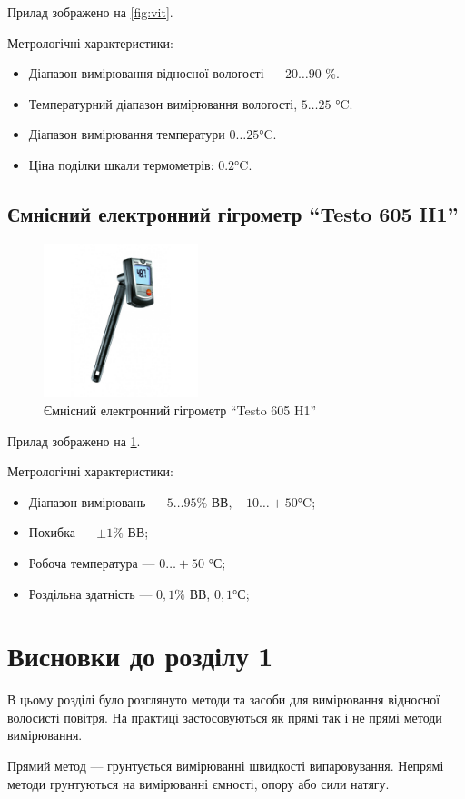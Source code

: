 Прилад зображено на \ref{fig:vit}.

Метрологічні характеристики:
\begin{itemize}
\item Діапазон вимірювання відносної вологості --- $20 \ldots 90$ \%.
\item Температурний діапазон вимірювання вологості,  $5 \ldots 25$ °C.
\item Діапазон вимірювання температури $0 \ldots 25$°C.
\item Ціна поділки шкали термометрів:  $0.2$°C.
\end{itemize}

\subsection{Ємнісний електронний гігрометр ``Testo 605 H1''}
\begin{figure}[!ht]
\centering
\includegraphics[width=0.4\textwidth]{./images/testo.jpg}
\caption{Ємнісний електронний гігрометр ``Testo 605 H1''}
\label{fig:testo}
\end{figure}

Прилад зображено на \ref{fig:testo}.

Метрологічні характеристики:
\begin{itemize}
\item Діапазон вимірювань --- $5 \ldots 95 \%$ ВВ,  $-10 \ldots +50$°C;
\item Похибка --- $\pm 1\%$ ВВ;
\item Робоча температура ---  $0 \ldots +50$ °С;
\item Роздільна здатність --- $0,1 \%$ ВВ, $0,1$°С;
\end{itemize}

\newpage
\section*{Висновки до розділу 1}

В цьому розділі було розглянуто методи та засоби для вимірювання відносної волосисті повітря.
На практиці застосовуються як прямі так і не прямі методи вимірювання.

Прямий метод --- грунтується вимірюванні швидкості випаровування. Непрямі методи грунтуються на
вимірюванні ємності, опору або сили натягу.
